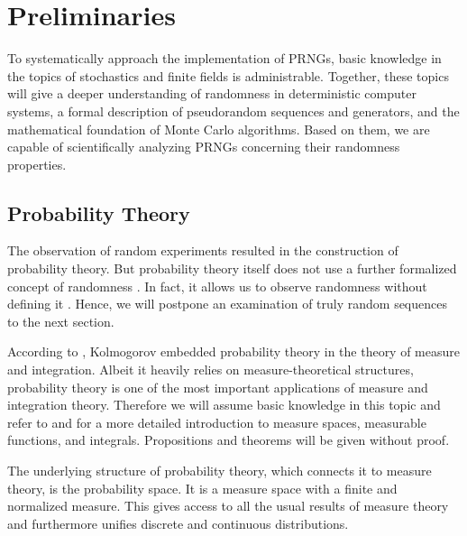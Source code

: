 \documentclass{stdlocal}
\begin{document}
\section{Preliminaries} %
\label{sub:preliminaries}
  To systematically approach the implementation of PRNGs, basic knowledge in the topics of stochastics and finite fields is administrable.
  Together, these topics will give a deeper understanding of randomness in deterministic computer systems, a formal description of pseudorandom sequences and generators, and the mathematical foundation of Monte Carlo algorithms.
  Based on them, we are capable of scientifically analyzing PRNGs concerning their randomness properties.

  \subsection{Probability Theory} %
  \label{ssub:stochastics}
    The observation of random experiments resulted in the construction of probability theory.
    But probability theory itself does not use a further formalized concept of randomness \autocite{schmidt2009}.
    In fact, it allows us to observe randomness without defining it \autocite{volchan2002}.
    Hence, we will postpone an examination of truly random sequences to the next section.

    According to \textcite{schmidt2009}, Kolmogorov embedded probability theory in the theory of measure and integration.
    Albeit it heavily relies on measure-theoretical structures, probability theory is one of the most important applications of measure and integration theory.
    Therefore we will assume basic knowledge in this topic and refer to \textcite{schmidt2009} and \textcite{elstrodt2011} for a more detailed introduction to measure spaces, measurable functions, and integrals.
    Propositions and theorems will be given without proof.

    The underlying structure of probability theory, which connects it to measure theory, is the probability space.
    It is a measure space with a finite and normalized measure.
    This gives access to all the usual results of measure theory and furthermore unifies discrete and continuous distributions.
    \autocite[p.~193~ff.]{schmidt2009}
\end{document}
